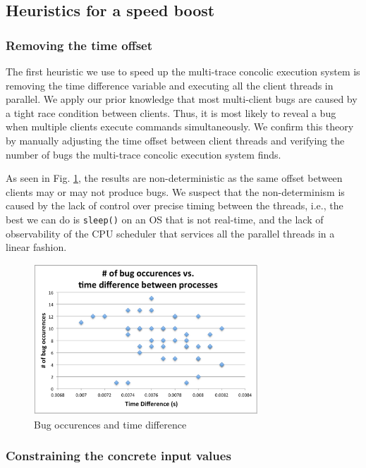 \documentclass{llncs}
\begin{document}
\subsection{Heuristics for a speed boost}

\subsubsection{Removing the time offset}

The first heuristic we use to speed up the multi-trace concolic
execution system is removing the time difference variable and
executing all the client threads in parallel. We apply our prior
knowledge that most multi-client bugs are caused by a tight race
condition between clients. Thus, it is most likely to reveal a bug
when multiple clients execute commands simultaneously. We confirm this
theory by manually adjusting the time offset between client threads
and verifying the number of bugs the multi-trace concolic execution
system finds.

As seen in Fig. \ref{fig:error}, the results are non-deterministic as
the same offset between clients may or may not produce bugs. We
suspect that the non-determinism is caused by the lack of control over
precise timing between the threads, i.e., the best we can do is
\texttt{sleep()} on an OS that is not real-time, and the lack of
observability of the CPU scheduler that services all the parallel
threads in a linear fashion.

\begin{figure}
  \begin{center}
    \includegraphics[width=0.75\textwidth]{graph.png}
  \end{center}
  \caption{Bug occurences and time difference}
  \label{fig:error}
\end{figure}

\subsubsection{Constraining the concrete input values}
\end{document}

